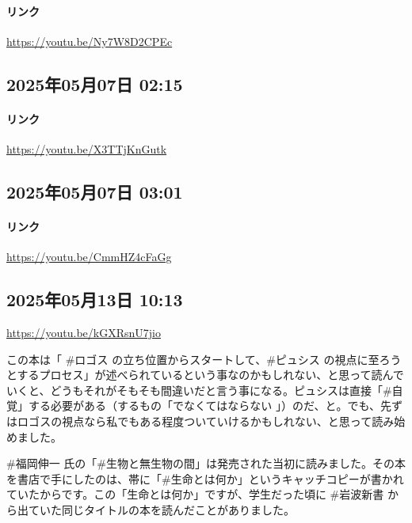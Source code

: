 \paragraph{リンク}
\url{https://youtu.be/Ny7W8D2CPEc}

\subsection*{2025年05月07日 02:15}

\paragraph{リンク}
\url{https://youtu.be/X3TTjKnGutk}

\subsection*{2025年05月07日 03:01}

\paragraph{リンク}
\url{https://youtu.be/CmmHZ4cFaGg}

\subsection*{2025年05月13日 10:13}

\url{https://youtu.be/kGXRsnU7jio}

この本は「 \#ロゴス の立ち位置からスタートして、\#ピュシス の視点に至ろうとするプロセス」が述べられているという事なのかもしれない、と思って読んでいくと、どうもそれがそもそも間違いだと言う事になる。ピュシスは直接「\#自覚」する必要がある（するもの「でなくてはならない 」）のだ、と。でも、先ずはロゴスの視点なら私でもある程度ついていけるかもしれない、と思って読み始めました。

\#福岡伸一 氏の「\#生物と無生物の間」は発売された当初に読みました。その本を書店で手にしたのは、帯に「\#生命とは何か」というキャッチコピーが書かれていたからです。この「生命とは何か」ですが、学生だった頃に \#岩波新書 から出ていた同じタイトルの本を読んだことがありました。

